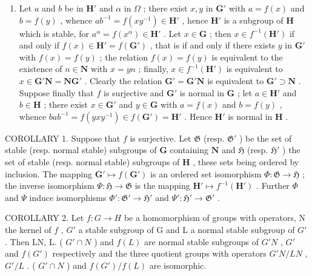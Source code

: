 \begin{enumerate}
\def\labelenumi{(\alph{enumi})}
\setcounter{enumi}{1}
\tightlist
\item
  Let \(a\) and \(b\) be in \(\mathbf{H}'\) and \(\alpha\) in \(\Omega\) ; there exist \(x, y\) in \(\mathbf{G}'\) with \(a = f(x)\) and \(b = f(y)\) , whence \(ab^{-1} = f(xy^{-1}) \in \mathbf{H}'\) , hence \(\mathbf{H}'\) is a subgroup of \(\mathbf{H}\) which is stable, for \(a^{\alpha} = f(x^{\alpha}) \in \mathbf{H}'\) . Let \(x \in \mathbf{G}\) ; then \(x \in f^{-1}(\mathbf{H}')\) if and only if \(f(x) \in \mathbf{H}' = f(\mathbf{G}')\) , that is if and only if there exists \(y\) in \(\mathbf{G}'\) with \(f(x) = f(y)\) ; the relation \(f(x) = f(y)\) is equivalent to the existence of \(n \in \mathbf{N}\) with \(x = yn\) ; finally, \(x \in f^{-1}(\mathbf{H}')\) is equivalent to \(x \in \mathbf{G}'\mathbf{N} = \mathbf{NG}'\) . Clearly the relation \(\mathbf{G}' = \mathbf{G}'\mathbf{N}\) is equivalent to \(\mathbf{G}' \supset \mathbf{N}\) . Suppose finally that \(f\) is surjective and \(\mathbf{G}'\) is normal in \(\mathbf{G}\) ; let \(a \in \mathbf{H}'\) and \(b \in \mathbf{H}\) ; there exist \(x \in \mathbf{G}'\) and \(y \in \mathbf{G}\) with \(a = f(x)\) and \(b = f(y)\) , whence \(bab^{-1} = f(yxy^{-1}) \in f(\mathbf{G}') = \mathbf{H}'\) . Hence \(\mathbf{H}'\) is normal in \(\mathbf{H}\) .
\end{enumerate}

COROLLARY 1. Suppose that \(f\) is surjective. Let \(\mathfrak{G}\) (resp. \(\mathfrak{G}'\) ) be the set of stable (resp. normal stable) subgroups of \(\mathbf{G}\) containing \(\mathbf{N}\) and \(\mathfrak{H}\) (resp. \(\mathfrak{H}'\) ) the set of stable (resp. normal stable) subgroups of \(\mathbf{H}\) , these sets being ordered by inclusion. The mapping \(\mathbf{G}' \mapsto f(\mathbf{G}')\) is an ordered set isomorphism \(\Phi: \mathfrak{G} \to \mathfrak{H}\) ; the inverse isomorphism \(\Psi: \mathfrak{H} \to \mathfrak{G}\) is the mapping \(\mathbf{H}' \mapsto f^{-1}(\mathbf{H}')\) . Further \(\Phi\) and \(\Psi\) induce isomorphisms \(\Phi': \mathfrak{G}' \to \mathfrak{H}'\) and \(\Psi': \mathfrak{H}' \to \mathfrak{G}'\) .

COROLLARY 2. Let \(f: G \to H\) be a homomorphism of groups with operators, N the kernel of \(f\) , \(G'\) a stable subgroup of G and L a normal stable subgroup of \(G'\) . Then LN, L. ( \(G' \cap N\) ) and \(f(L)\) are normal stable subgroups of \(G'N\) , \(G'\) and \(f(G')\) respectively and the three quotient groups with operators \(G'N/LN\) , \(G'/L\) . ( \(G' \cap N\) ) and \(f(G')/f(L)\) are isomorphic.

